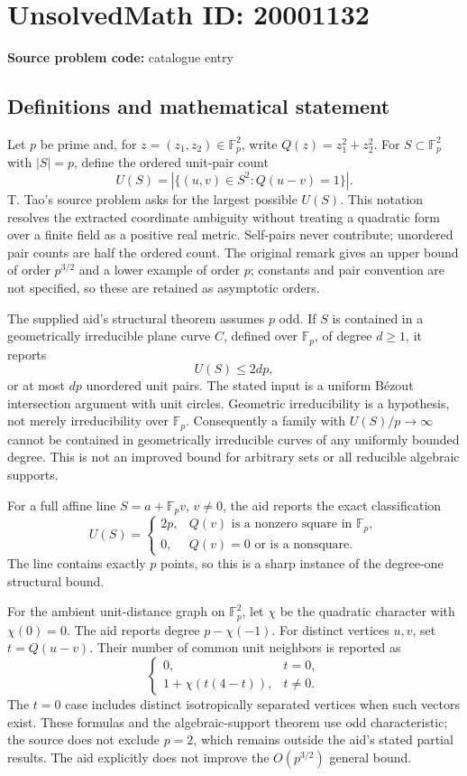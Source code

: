 \documentclass[11pt]{article}
\newcommand{\F}{\mathbb{F}}
\begin{document}
\section*{UnsolvedMath ID: 20001132}
\textbf{Source problem code:} catalogue entry
\subsection{Definitions and mathematical statement}
Let \(p\) be prime and, for \(z=(z_1,z_2)\in\F_p^2\), write \(Q(z)=z_1^2+z_2^2\). For \(S\subset\F_p^2\) with \(|S|=p\), define the ordered unit-pair count
\[
 U(S)=|\{(u,v)\in S^2:Q(u-v)=1\}|.
\]
T. Tao's source problem asks for the largest possible \(U(S)\). This notation resolves the extracted coordinate ambiguity without treating a quadratic form over a finite field as a positive real metric. Self-pairs never contribute; unordered pair counts are half the ordered count. The original remark gives an upper bound of order \(p^{3/2}\) and a lower example of order \(p\); constants and pair convention are not specified, so these are retained as asymptotic orders.

The supplied aid's structural theorem assumes \(p\) odd. If \(S\) is contained in a geometrically irreducible plane curve \(C\), defined over \(\F_p\), of degree \(d\ge1\), it reports
\[
 U(S)\le2dp,
\]
or at most \(dp\) unordered unit pairs. The stated input is a uniform B\'ezout intersection argument with unit circles. Geometric irreducibility is a hypothesis, not merely irreducibility over \(\F_p\). Consequently a family with \(U(S)/p\to\infty\) cannot be contained in geometrically irreducible curves of any uniformly bounded degree. This is not an improved bound for arbitrary sets or all reducible algebraic supports.

For a full affine line \(S=a+\F_pv\), \(v\ne0\), the aid reports the exact classification
\[
 U(S)=\begin{cases}
 2p,&Q(v)\text{ is a nonzero square in }\F_p,\\
 0,&Q(v)=0\text{ or is a nonsquare}.
 \end{cases}
\]
The line contains exactly \(p\) points, so this is a sharp instance of the degree-one structural bound.

For the ambient unit-distance graph on \(\F_p^2\), let \(\chi\) be the quadratic character with \(\chi(0)=0\). The aid reports degree \(p-\chi(-1)\). For distinct vertices \(u,v\), set \(t=Q(u-v)\). Their number of common unit neighbors is reported as
\[
 \begin{cases}
 0,&t=0,\\
 1+\chi(t(4-t)),&t\ne0.
 \end{cases}
\]
The \(t=0\) case includes distinct isotropically separated vertices when such vectors exist. These formulas and the algebraic-support theorem use odd characteristic; the source does not exclude \(p=2\), which remains outside the aid's stated partial results. The aid explicitly does not improve the \(O(p^{3/2})\) general bound.
\end{document}

